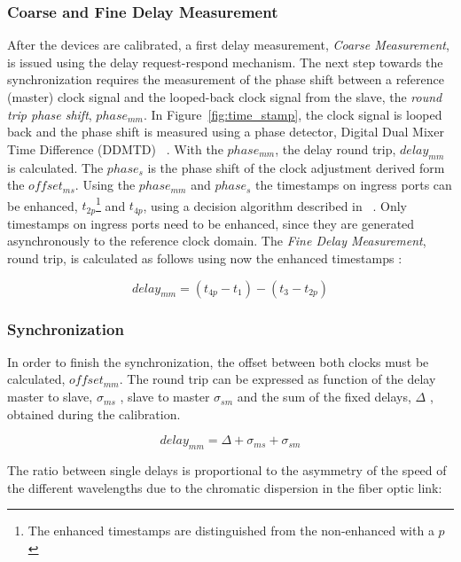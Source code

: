 \subsubsection{Coarse and Fine Delay Measurement}

After the devices are calibrated, a first delay measurement, \textit{Coarse
Measurement}, is issued using the delay request-respond mechanism. 
The next step towards the synchronization requires the measurement of the phase shift
between a reference (master) clock signal and the looped-back clock signal
from  the slave, the \textit{round trip phase shift}, $phase_{mm}$. In Figure~\ref{fig:time_stamp}, 
the clock signal is looped back and the phase shift is measured 
using a phase detector, Digital Dual Mixer Time Difference (DDMTD) ~\cite{biblio:ddmtd}. With the
$phase_{mm}$, the delay round trip, $delay_{mm}$ is calculated. The $phase_{s}$
is the phase shift of the clock adjustment derived form the $offset_{ms}$. Using the 
$phase_{mm}$ and $phase_{s}$ the timestamps on ingress ports can be enhanced,
$t_{2p}$\footnote{The enhanced timestamps are distinguished from the
non-enhanced with a $p$} and  $t_{4p}$, using a decision algorithm described in ~\cite{biblio:tomas}.
Only timestamps on ingress ports need to be enhanced, since they are generated 
asynchronously to the reference clock domain. The \textit{Fine Delay Measurement}, round trip,
is calculated as follows using now the enhanced timestamps :

\begin{equation}
  \label{eq:round_trip}
    delay_{mm} = (t_{4p} - t_1) - (t_3 - t_{2p})
\end{equation}

\subsubsection{Synchronization}

In order to finish the synchronization, the offset between both clocks must be calculated, $offset_{mm}$. 
The round trip can be expressed as function of the  delay master to slave, $\sigma _{ms}$ , slave to
master $\sigma _{sm}$ and the sum of the fixed delays, $\Delta$ , obtained during the calibration.

\begin{equation}
  \label{eq:round_trip_2}
    delay_{mm} = \Delta + \sigma _{ms} + \sigma _{sm}
\end{equation}

The ratio between single delays is proportional to the asymmetry of the speed of
the different wavelengths due to the chromatic dispersion in the fiber optic
link:

